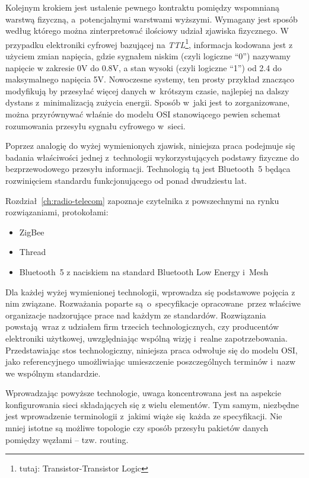 Kolejnym krokiem jest ustalenie pewnego kontraktu pomiędzy wspomnianą warstwą fizyczną, a~potencjalnymi
warstwami wyższymi. Wymagany jest sposób według którego można zinterpretować ilościowy udział
zjawiska fizycznego. W przypadku elektroniki cyfrowej bazującej na \textit{TTL}\footnote{tutaj: Transistor-Transistor Logic},
informacja kodowana jest z użyciem zmian napięcia, gdzie sygnałem niskim (czyli logiczne \enquote{0}) nazywamy 
napięcie w zakresie 0V do 0.8V, a stan wysoki (czyli logiczne \enquote{1}) od 2.4 do maksymalnego napięcia 5V.
Nowoczesne systemy, ten prosty przykład znacząco modyfikują by przesyłać więcej danych w~krótszym czasie,
najlepiej na dalszy dystans z~minimalizacją zużycia energii. Sposób w~jaki jest to zorganizowane,
można przyrównywać właśnie do modelu \gls{OSI} stanowiącego pewien schemat rozumowania przesyłu sygnału
cyfrowego w~sieci.

Poprzez analogię do wyżej wymienionych zjawisk, niniejsza praca podejmuje się badania właściwości
jednej z~technologii wykorzystujących podstawy fizyczne do bezprzewodowego przesyłu informacji. 
Technologią tą jest Bluetooth~5 będąca rozwinięciem standardu funkcjonującego od ponad dwudziestu lat.

Rozdział~\ref{ch:radio-telecom} zapoznaje czytelnika z powszechnymi na rynku rozwiązaniami, protokołami:
\begin{itemize}
\item ZigBee
\item Thread
\item Bluetooth~5 z naciskiem na standard Bluetooth Low Energy i~Mesh
\end{itemize}

Dla każdej wyżej wymienionej technologii, wprowadza się podstawowe pojęcia z nim związane. Rozważania
poparte są o~specyfikacje opracowane przez właściwe organizacje nadzorujące prace nad każdym ze
standardów. Rozwiązania powstają wraz z udziałem firm trzecich technologicznych, czy producentów
elektroniki użytkowej, uwzględniając wspólną wizję i~realne zapotrzebowania. Przedstawiając
stos technologiczny, niniejsza praca odwołuje się do modelu \gls{OSI}, jako referencyjnego umożliwiając
umieszczenie poszczególnych terminów i~nazw we wspólnym standardzie.

Wprowadzając powyższe technologie, uwaga koncentrowana jest na aspekcie konfigurowania sieci
składających się z wielu elementów. Tym samym, niezbędne jest wprowadzenie terminologii z~jakimi
wiąże się każda ze specyfikacji. Nie mniej istotne są możliwe topologie czy sposób przesyłu
pakietów danych pomiędzy węzłami -- tzw. routing.

